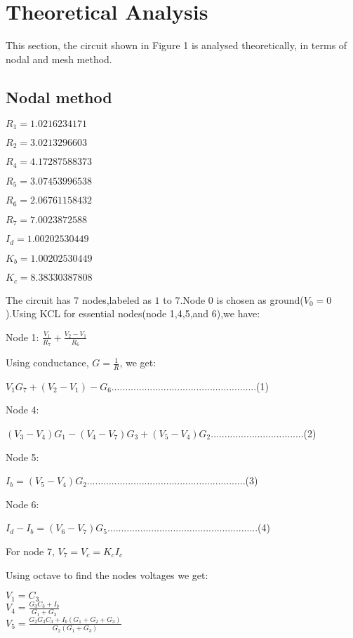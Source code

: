 \section{Theoretical Analysis}
\label{sec:analysis}
This section, the circuit shown in Figure 1 is analysed
theoretically, in terms of nodal and mesh method.

\subsection{Nodal method}

$R_1=1.0216234171$

$R_2=3.0213296603$

$R_4=4.17287588373$

$R_5=3.07453996538$

$R_6=2.06761158432$

$R_7=7.0023872588$

$I_d=1.00202530449$

$K_b=1.00202530449$

$K_c=8.38330387808$


The circuit has $7$ nodes,labeled as $1$ to $7$.Node $0$ is chosen as ground($V_0=0$).Using KCL for essential nodes(node 1,4,5,and 6),we have:


Node 1: $\frac{V_1}{R_7}+\frac{V_2-V_1}{R_6}$

Using conductance, $G=\frac{1}{R}$, we get:

$V_1G_7+(V_2-V_1)-G_6$.....................................................(1)

Node 4:

$(V_3-V_4)G_1-(V_4-V_7)G_3+(V_5-V_4)G_2$..................................(2)

Node 5:

$I_b=(V_5-V_4)G_2$..........................................................(3)

Node 6:

$I_d-I_b=(V_6-V_7)G_5$.......................................................(4)

For node 7, $V_7=V_c=K_cI_c$


Using octave to find the nodes voltages we get:

$V_1=C_3$\\

$V_4=\frac{G_3C_3+I_b}{G_1+G_3}$\\


$V_5=\frac{G_2G_3C_3+I_b(G_1+G_2+G_3)}{G_2(G_1+G_3)}$\\


